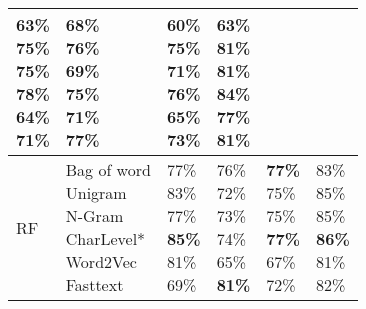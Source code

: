 \documentclass[sn-mathphys,Numbered]{sn-jnl}%
\begin{document}
\begin{table}[ht]
\begin{tabular}{llllll}
\makecell{63\% \\75\%\\ 75\%\\ \textbf{78\%}\\ 64\% \\71\%}&
\makecell{68\% \\ 76\%\\ 69\%\\ 75\% \\ 71\%\\ \textbf{77\%}}&
\makecell{60\% \\ 75\%\\  71\%\\ \textbf{76\%} \\ 65\% \\73\%}&
\makecell{63\% \\ 81\%\\81\%\\ \textbf{84\%} \\77\% \\81\%}\\
\hline
RF & \makecell{Bag of word\\  Unigram\\ N-Gram\\CharLevel*\\ Word2Vec \\Fasttext} & 
\makecell{77\%\\ 83\%\\ 77\%\\ \textbf{85\% }\\ 81\% \\69\%}&
\makecell{76\% \\ 72\%\\ 73\%\\74\% \\ 65\% \\\textbf{81\%}}&
\makecell{\textbf{77\%} \\ 75\%\\ 75\%\\ \textbf{77\%} \\ 67\% \\ 72\%}&
\makecell{83\% \\ 85\%\\ 85\%\\\textbf{86\%} \\ 81\% \\82\%}

\end{tabular}
\end{table}
\end{document}
